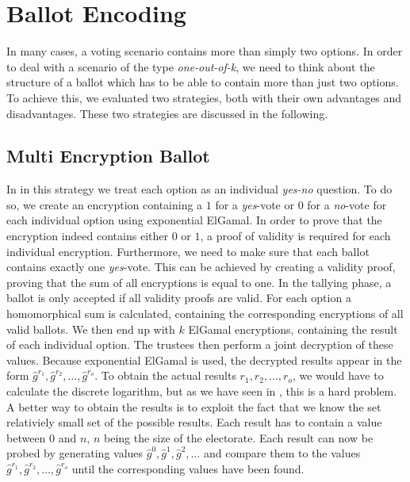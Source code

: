 \documentclass[numbers=noenddot, abstract=on, a4paper, headsepline,
footsepline, oneside, draft=off]{scrreprt}
\begin{document}
\section{Ballot Encoding}
In many cases, a voting scenario contains more than simply two options. In order
to deal with a scenario of the type \emph{one-out-of-k}, we need to think about
the structure of a ballot which has to be able to contain more than just two
options. To achieve this, we evaluated two strategies, both with their own
advantages and disadvantages. These two strategies are discussed in the
following.

\subsection{Multi Encryption Ballot}
In in this strategy we treat each option as an individual \emph{yes-no}
question. To do so, we create an encryption containing a $1$ for a
\emph{yes}-vote or $0$ for a \emph{no}-vote for each individual option using
exponential ElGamal. In order to prove that the encryption indeed contains
either $0$ or $1$, a proof of validity is required for each individual
encryption.
Furthermore, we need to make sure that each ballot contains exactly one
\emph{yes}-vote. This can be achieved by creating a validity proof, proving that
the sum of all encryptions is equal to one. In the
tallying phase, a ballot is only accepted if all validity proofs are valid. For
each option a homomorphical sum is calculated, containing the corresponding
encryptions of all valid ballots. We then end up with $k$ ElGamal encryptions,
containing the result of each individual option. The trustees then perform a
joint decryption of these values. Because exponential ElGamal is used, the
decrypted results appear in the form $\hat{g}^{r_1}, \hat{g}^{r_2}, \ldots,
\hat{g}^{r_o}$. To obtain the actual results $r_1, r_2, \ldots, r_o$, we would
have to calculate the discrete logarithm, but as
we have seen in , this is a hard problem. A better
way to obtain the results is to exploit the fact that we know the set
relativiely small set of the possible results. Each result has to contain a
value between $0$ and $n$, $n$ being the size of the electorate. Each result can
now be probed by generating values $\hat{g}^0, \hat{g}^1, \hat{g}^2, \ldots$ and
compare them to the values $\hat{g}^{r_1}, \hat{g}^{r_2}, \ldots,
\hat{g}^{r_o}$ until the corresponding values have been found.
\end{document}
